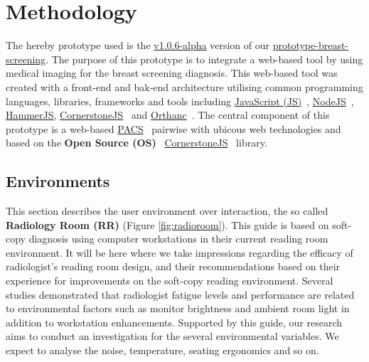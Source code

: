 \section{Methodology}

The hereby prototype used is the \hyperlink{https://github.com/MIMBCD-UI/prototype-breast-screening/releases/tag/v1.0.6-alpha}{v1.0.6-alpha} version of our \hyperlink{https://github.com/MIMBCD-UI/prototype-breast-screening/}{prototype-breast-screening}. The purpose of this prototype is to integrate a web-based tool by using medical imaging for the breast screening diagnosis. This web-based tool was created with a front-end and bak-end architecture utilising common programming languages, libraries, frameworks and tools including \hyperlink{https://www.javascript.com/}{JavaScript (JS)}~\cite{flanagan2006javascript}, \hyperlink{https://nodejs.org/}{NodeJS}~\cite{wilson2018node}, \hyperlink{https://hammerjs.github.io/}{HammerJS}, \hyperlink{https://cornerstonejs.org/}{CornerstoneJS}~\cite{hostetter2018integration} and \hyperlink{https://www.orthanc-server.com/}{Orthanc}~\cite{Jodogne:ISBI2013}. The central component of this prototype is a web-based \hyperlink{https://www.sciencedirect.com/topics/medicine-and-dentistry/picture-archiving-and-communication-system}{PACS}~\cite{cooke2003picture} pairwise with ubicous web technologies and based on the \textbf{Open Source (OS)}~\cite{feller2002understanding} \hyperlink{https://cornerstonejs.org/}{CornerstoneJS}~\cite{hostetter2018integration} library.


\subsection{Environments}

This section describes the user environment over interaction, the so called \textbf{Radiology Room (RR)} (Figure \ref{fig:radioroom}). This guide is based on soft-copy diagnosis using computer workstations in their current reading room environment. It will be here where we take impressions regarding the efficacy of radiologist's reading room design, and their recommendations based on their experience for improvements on the soft-copy reading environment. Several studies demonstrated that radiologist fatigue levels and performance are related to environmental factors such as monitor brightness and ambient room light in addition to workstation enhancements. Supported by this guide, our research aims to conduct an investigation for the several environmental variables. We expect to analyse the noise, temperature, seating ergonomics and so on.

